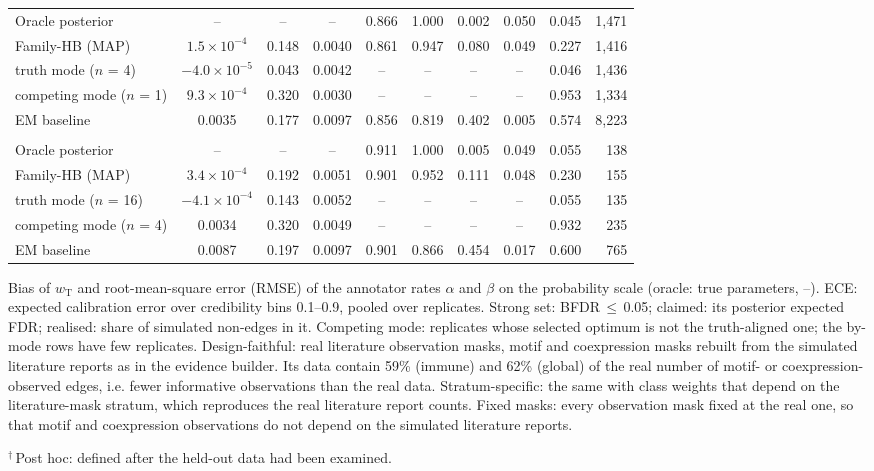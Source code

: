 \begin{table}[htbp]
\begin{tabular}{@{}lccccccccr@{}}
Oracle posterior & -- & -- & -- & 0.866 & 1.000 & 0.002 & 0.050 & 0.045 & 1{,}471 \\
Family-HB (MAP) & $1.5\times 10^{-4}$ & 0.148 & 0.0040 & 0.861 & 0.947 & 0.080 & 0.049 & 0.227 & 1{,}416 \\
\quad truth mode ($n$ = 4) & $-4.0\times 10^{-5}$ & 0.043 & 0.0042 & -- & -- & -- & -- & 0.046 & 1{,}436 \\
\quad competing mode ($n$ = 1) & $9.3\times 10^{-4}$ & 0.320 & 0.0030 & -- & -- & -- & -- & 0.953 & 1{,}334 \\
EM baseline & 0.0035 & 0.177 & 0.0097 & 0.856 & 0.819 & 0.402 & 0.005 & 0.574 & 8{,}223 \\
\addlinespace[3pt]
\multicolumn{10}{@{}l}{\emph{Fixed observation masks (sensitivity), immune universe: 20 replicates, competing mode in 4}} \\
Oracle posterior & -- & -- & -- & 0.911 & 1.000 & 0.005 & 0.049 & 0.055 & 138 \\
Family-HB (MAP) & $3.4\times 10^{-4}$ & 0.192 & 0.0051 & 0.901 & 0.952 & 0.111 & 0.048 & 0.230 & 155 \\
\quad truth mode ($n$ = 16) & $-4.1\times 10^{-4}$ & 0.143 & 0.0052 & -- & -- & -- & -- & 0.055 & 135 \\
\quad competing mode ($n$ = 4) & 0.0034 & 0.320 & 0.0049 & -- & -- & -- & -- & 0.932 & 235 \\
EM baseline & 0.0087 & 0.197 & 0.0097 & 0.901 & 0.866 & 0.454 & 0.017 & 0.600 & 765 \\
\bottomrule
\end{tabular}
\par\smallskip
\begin{minipage}{\linewidth}\footnotesize
Bias of $w_{\mathrm T}$ and root-mean-square error (RMSE) of the annotator rates $\alpha$ and $\beta$ on the probability scale (oracle: true parameters, --). ECE: expected calibration error over credibility bins 0.1--0.9, pooled over replicates. Strong set: BFDR\,$\le$\,0.05; claimed: its posterior expected FDR; realised: share of simulated non-edges in it. Competing mode: replicates whose selected optimum is not the truth-aligned one; the by-mode rows have few replicates. Design-faithful: real literature observation masks, motif and coexpression masks rebuilt from the simulated literature reports as in the evidence builder. Its data contain 59\% (immune) and 62\% (global) of the real number of motif- or coexpression-observed edges, i.e. fewer informative observations than the real data. Stratum-specific: the same with class weights that depend on the literature-mask stratum, which reproduces the real literature report counts. Fixed masks: every observation mask fixed at the real one, so that motif and coexpression observations do not depend on the simulated literature reports.

$^{\dagger}$\,Post hoc: defined after the held-out data had been examined.
\end{minipage}
\end{table}
